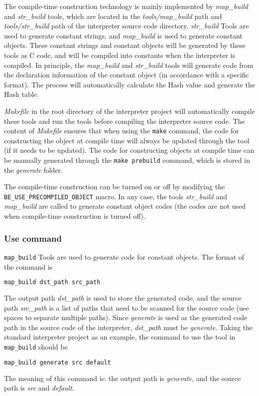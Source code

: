 The compile-time construction technology is mainly implemented by \textsl{map\_build} and \textsl{str\_build} tools, which are located in the \textsl{tools/map\_build} path and \textsl{tools/str\_build} path of the interpreter source code directory. \textsl{str\_build} Tools are used to generate constant strings, and \textsl{map\_build} is used to generate constant objects. These constant strings and constant objects will be generated by these tools as C code, and will be compiled into constants when the interpreter is compiled. In principle, the \textsl{map\_build} and \textsl{str\_build} tools will generate code from the declaration information of the constant object (in accordance with a specific format). The process will automatically calculate the Hash value and generate the Hash table.

\textsl{Makefile} in the root directory of the interpreter project will automatically compile these tools and run the tools before compiling the interpreter source code. The content of \textsl{Makefile} ensures that when using the \texttt{make} command, the code for constructing the object at compile time will always be updated through the tool (if it needs to be updated). The code for constructing objects at compile time can be manually generated through the \texttt{make prebuild} command, which is stored in the \textsl{generate} folder.

The compile-time construction can be turned on or off by modifying the \texttt{BE\_USE\_PRECOMPILED\_OBJECT} macro. In any case, the tools \textsl{str\_build} and \textsl{map\_build} are called to generate constant object codes (the codes are not used when compile-time construction is turned off).

\subsubsection {Use command}

\texttt{map\_build} Tools are used to generate code for constant objects. The format of the command is
\begin{lstlisting}[language=bash, numbers=none]
map_build dst_path src_path
\end{lstlisting}
The output path \textsl{dst\_path} is used to store the generated code, and the source path \textsl{src\_path} is a list of paths that need to be scanned for the source code (use spaces to separate multiple paths). Since \textsl{generate} is used as the generated code path in the source code of the interpreter, \textsl{dst\_path} must be \textsl{generate}. Taking the standard interpreter project as an example, the command to use the tool in \texttt{map\_build} should be
\begin{lstlisting}[language=bash, numbers=none]
map_build generate src default
\end{lstlisting}
The meaning of this command is: the output path is \textsl{generate}, and the source path is \textsl{src} and \textsl{default}.

